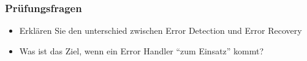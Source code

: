 \subsubsection*{Prüfungsfragen}

\begin{itemize}
	\item Erklären Sie den unterschied zwischen Error Detection und Error Recovery
	\item Was ist das Ziel, wenn ein Error Handler ``zum Einsatz'' kommt?
\end{itemize}

